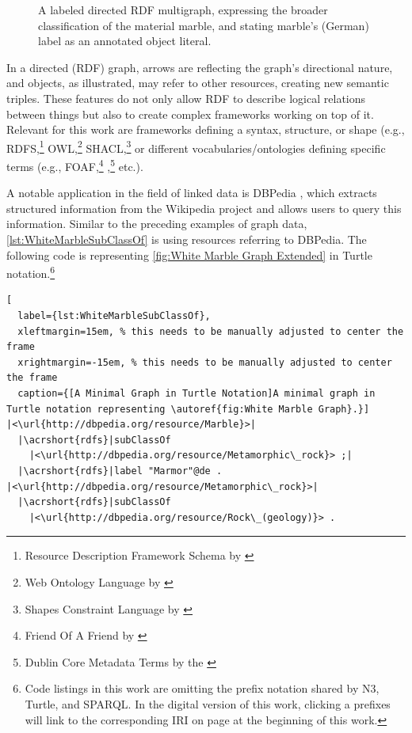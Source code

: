 \begin{figure}[ht]
    \libertineLF
    \centering
    
	\caption[A Labeled Directed \acrshort*{RDF} Multigraph]{A labeled directed \acrshort*{RDF} multigraph, expressing the broader classification of the material marble, and stating marble’s (German) label as an annotated object literal.}
	\label{fig:White Marble Graph Extended}
	\libertineOsF{}
\end{figure}

\noindent In a directed (\acrshort*{RDF}) graph, arrows are reflecting the graph’s directional nature, and objects, as illustrated, may refer to other resources, creating new semantic triples. These features do not only allow \acrshort*{RDF} to describe logical relations between things but also to create complex frameworks working on top of it. Relevant for this work are frameworks defining a syntax, structure, or shape (e.g., \acrshort*{RDFS},\footnote{Resource Description Framework Schema by \cite{RDFS1999}} \acrshort*{OWL},\footnote{Web Ontology Language by \cite{OWL2004}} \acrshort*{SHACL},\footnote{Shapes Constraint Language by \cite{SHACL2015}} or different vocabularies/ontologies defining specific terms (e.g., \acrshort*{FOAF},\footnote{Friend Of A Friend by \cite{Miller2014}} ,\footnote{Dublin Core Metadata Terms by the \cite{DublinCoreTerms}} etc.).

A notable application in the field of linked data is DBPedia \parencite{DBpedia2009}, which extracts structured information from the Wikipedia project and allows users to query this information. Similar to the preceding examples of graph data, \autoref{lst:WhiteMarbleSubClassOf} is using resources referring to DBPedia. The following code is representing \autoref{fig:White Marble Graph Extended} in Turtle notation.\footnote{Code listings in this work are omitting the prefix notation shared by N3, Turtle, and \acrshort*{SPARQL}. In the digital version of this work, clicking a prefixes will link to the corresponding \acrshort*{IRI} on page \pageref{ch:LOA} at the beginning of this work.}

\begin{spacing}{0.9}
  \lstset{language=JavaScript,escapechar=|}
  \begin{lstlisting}[
  label={lst:WhiteMarbleSubClassOf},
  xleftmargin=15em, % this needs to be manually adjusted to center the frame
  xrightmargin=-15em, % this needs to be manually adjusted to center the frame
  caption={[A Minimal Graph in Turtle Notation]A minimal graph in Turtle notation representing \autoref{fig:White Marble Graph}.}]
|<\url{http://dbpedia.org/resource/Marble}>|
  |\acrshort{rdfs}|subClassOf
    |<\url{http://dbpedia.org/resource/Metamorphic\_rock}> ;|
  |\acrshort{rdfs}|label "Marmor"@de .
|<\url{http://dbpedia.org/resource/Metamorphic\_rock}>|
  |\acrshort{rdfs}|subClassOf
    |<\url{http://dbpedia.org/resource/Rock\_(geology)}> .
\end{lstlisting}
\end{spacing}




